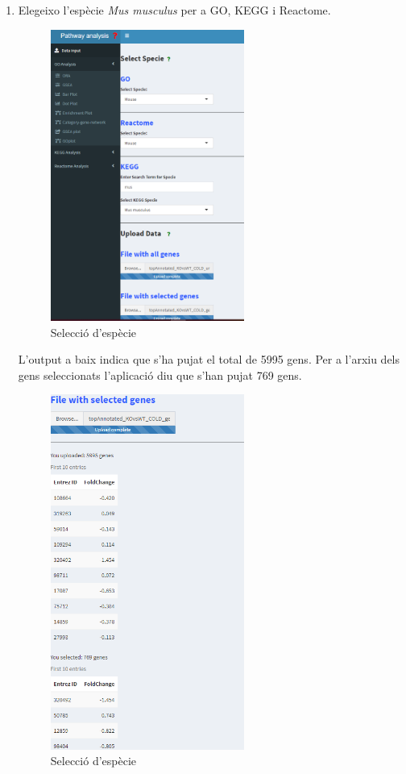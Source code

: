 \begin{enumerate}

\item Elegeixo l'espècie \textit{Mus musculus} per a \gls{GO}, \gls{KEGG} i Reactome.
\begin{figure}[H]
\centering
\includegraphics[width=0.6\textwidth]{figures/Estudi1_Fig1_Select_Specie.png} 
\caption{Selecció d'espècie}
\end{figure}

L'output a baix indica que s'ha pujat el total de 5995 gens. Per a l'arxiu dels gens seleccionats l'aplicació diu que s'han pujat 769 gens.

\begin{figure}[H]
\centering
\includegraphics[width=0.6\textwidth]{figures/Estudi1_Fig2_Select_Specie.png} 
\caption{Selecció d'espècie}
\end{figure}



\end{enumerate}

